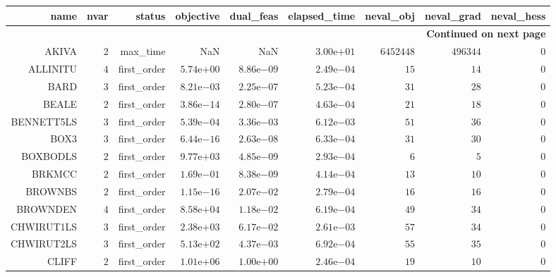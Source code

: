 \begin{longtable}{rrrrrrrrr}
\hline
name & nvar & status & objective & dual\_feas & elapsed\_time & neval\_obj & neval\_grad & neval\_hess \\\hline
\endhead
\hline
\multicolumn{9}{r}{{\bfseries Continued on next page}}\\
\hline
\endfoot
\endlastfoot
AKIVA & \(     2\) & max\_time &       NaN &       NaN & \( 3.00\)e\(+01\) & \(6452448\) & \(496344\) & \(     0\) \\
ALLINITU & \(     4\) & first\_order & \( 5.74\)e\(+00\) & \( 8.86\)e\(-09\) & \( 2.49\)e\(-04\) & \(    15\) & \(    14\) & \(     0\) \\
BARD & \(     3\) & first\_order & \( 8.21\)e\(-03\) & \( 2.25\)e\(-07\) & \( 5.23\)e\(-04\) & \(    31\) & \(    28\) & \(     0\) \\
BEALE & \(     2\) & first\_order & \( 3.86\)e\(-14\) & \( 2.80\)e\(-07\) & \( 4.63\)e\(-04\) & \(    21\) & \(    18\) & \(     0\) \\
BENNETT5LS & \(     3\) & first\_order & \( 5.39\)e\(-04\) & \( 3.36\)e\(-03\) & \( 6.12\)e\(-03\) & \(    51\) & \(    36\) & \(     0\) \\
BOX3 & \(     3\) & first\_order & \( 6.44\)e\(-16\) & \( 2.63\)e\(-08\) & \( 6.33\)e\(-04\) & \(    31\) & \(    30\) & \(     0\) \\
BOXBODLS & \(     2\) & first\_order & \( 9.77\)e\(+03\) & \( 4.85\)e\(-09\) & \( 2.93\)e\(-04\) & \(     6\) & \(     5\) & \(     0\) \\
BRKMCC & \(     2\) & first\_order & \( 1.69\)e\(-01\) & \( 8.38\)e\(-09\) & \( 4.14\)e\(-04\) & \(    13\) & \(    10\) & \(     0\) \\
BROWNBS & \(     2\) & first\_order & \( 1.15\)e\(-16\) & \( 2.07\)e\(-02\) & \( 2.79\)e\(-04\) & \(    16\) & \(    16\) & \(     0\) \\
BROWNDEN & \(     4\) & first\_order & \( 8.58\)e\(+04\) & \( 1.18\)e\(-02\) & \( 6.19\)e\(-04\) & \(    49\) & \(    34\) & \(     0\) \\
CHWIRUT1LS & \(     3\) & first\_order & \( 2.38\)e\(+03\) & \( 6.17\)e\(-02\) & \( 2.61\)e\(-03\) & \(    57\) & \(    34\) & \(     0\) \\
CHWIRUT2LS & \(     3\) & first\_order & \( 5.13\)e\(+02\) & \( 4.37\)e\(-03\) & \( 6.92\)e\(-04\) & \(    55\) & \(    35\) & \(     0\) \\
CLIFF & \(     2\) & first\_order & \( 1.01\)e\(+06\) & \( 1.00\)e\(+00\) & \( 2.46\)e\(-04\) & \(    19\) & \(    10\) & \(     0\) \\

\end{longtable}

